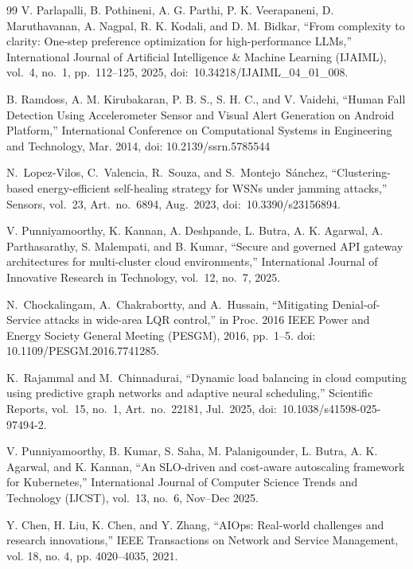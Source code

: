 \documentclass[conference]{IEEEtran}
\begin{document}
\begin{thebibliography}{99}
V. Parlapalli, B. Pothineni, A. G. Parthi, P. K. Veerapaneni, D. Maruthavanan, A. Nagpal, R. K. Kodali, and D. M. Bidkar,
``From complexity to clarity: One-step preference optimization for high-performance LLMs,''
International Journal of Artificial Intelligence \& Machine Learning (IJAIML),
vol.~4, no.~1, pp.~112--125, 2025, doi:~10.34218/IJAIML\_04\_01\_008.

B. Ramdoss, A. M. Kirubakaran, P. B. S., S. H. C., and V. Vaidehi, ``Human Fall Detection Using Accelerometer Sensor and Visual Alert Generation on Android Platform,'' International Conference on Computational Systems in Engineering and Technology, Mar. 2014, doi: 10.2139/ssrn.5785544

N.~Lopez-Vilos, C.~Valencia, R.~Souza, and S.~Montejo~Sánchez,
``Clustering-based energy-efficient self-healing strategy for WSNs under jamming attacks,''
Sensors,
vol.~23, Art.~no.~6894, Aug.~2023,
doi:~10.3390/s23156894.


 V. Punniyamoorthy, K. Kannan, A. Deshpande, L. Butra, A. K. Agarwal, A. Parthasarathy, S. Malempati, and B. Kumar, ``Secure and governed API gateway architectures for multi-cluster cloud environments,'' International Journal of Innovative Research in Technology, vol.~12, no.~7, 2025.

N.~Chockalingam, A.~Chakrabortty, and A.~Hussain, 
``Mitigating Denial-of-Service attacks in wide-area LQR control,'' 
in Proc. 2016 IEEE Power and Energy Society General Meeting (PESGM), 
2016, pp.~1--5. 
doi: 10.1109/PESGM.2016.7741285.

K.~Rajammal and M.~Chinnadurai,
``Dynamic load balancing in cloud computing using predictive graph networks and adaptive neural scheduling,''
Scientific Reports,
vol.~15, no.~1, Art.~no.~22181, Jul.~2025,
doi:~10.1038/s41598-025-97494-2.

V. Punniyamoorthy, B. Kumar, S. Saha, M. Palanigounder, L. Butra, A. K. Agarwal, and K. Kannan,
``An SLO-driven and cost-aware autoscaling framework for Kubernetes,''
International Journal of Computer Science Trends and Technology (IJCST),
vol.~13, no.~6, Nov--Dec 2025.

Y. Chen, H. Liu, K. Chen, and Y. Zhang, “AIOps: Real-world challenges and research innovations,” IEEE Transactions on Network and Service Management, vol. 18, no. 4, pp. 4020–4035, 2021.


\end{thebibliography}
\end{document}

